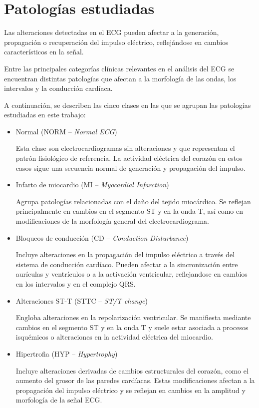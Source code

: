 \documentclass[12pt,a4paper,twoside]{book}
\begin{document}
\section{Patologías estudiadas}
\label{sec:patologias_estudiadas}

Las  alteraciones detectadas en el ECG pueden afectar a la generación, propagación o recuperación del impulso eléctrico, reflejándose en cambios característicos en la señal.

Entre las principales categorías clínicas relevantes en el análisis del ECG se encuentran distintas patologías que afectan a la morfología de las ondas, los intervalos y la conducción cardíaca. 

A continuación, se describen las cinco clases en las que se agrupan las patologías estudiadas en este trabajo:

\begin{itemize}
	\item Normal (NORM -- \textit{Normal ECG})
	
	Esta clase son electrocardiogramas sin alteraciones y que representan el patrón fisiológico de referencia.
	La actividad eléctrica del corazón en estos casos sigue una secuencia normal de generación y propagación del impulso.

	\item Infarto de miocardio (MI -- \textit{Myocardial Infarction})
	
	Agrupa patologías relacionadas con el daño del tejido miocárdico. 
	Se reflejan principalmente en cambios en el segmento ST y en la onda T, así como en modificaciones de la morfología general del electrocardiograma.
	
	\item Bloqueos de conducción (CD -- \textit{Conduction Disturbance})
	
	Incluye alteraciones en la propagación del impulso eléctrico a través del sistema de conducción cardíaco. 
	Pueden afectar a la sincronización entre aurículas y ventrículos o a la activación ventricular, reflejandose en cambios en los intervalos y en el complejo QRS.
	
	\item Alteraciones ST-T (STTC -- \textit{ST/T change})
	
	Engloba alteraciones en la repolarización ventricular. Se manifiesta mediante cambios en el segmento ST y en la onda T y suele estar asociada a procesos isquémicos o alteraciones en la actividad eléctrica del miocardio.
	
	\item Hipertrofia (HYP -- \textit{Hypertrophy})
	
	Incluye alteraciones derivadas de cambios estructurales del corazón, como el aumento del grosor de las paredes cardíacas. 
	Estas modificaciones afectan a la propagación del impulso eléctrico y se reflejan en cambios en la amplitud y morfología de la señal ECG.
\end{itemize}
\end{document}
